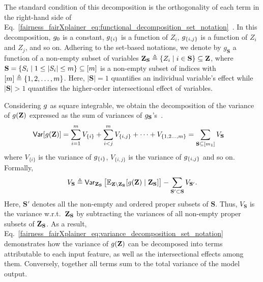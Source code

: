 The standard condition of this decomposition is the orthogonality of each term in the right-hand side of Eq.~\eqref{fairness_fairXplainer_eq:functional_decomposition_set_notation}~\cite{sobol1990sensitivity}. In this decomposition, $ g_0 $ is a constant, $ g_{\{i\}} $ is a function of $ Z_i $, $ g_{\{i,j\}} $ is a function of $ Z_i $ and $ Z_j $, and so on. Adhering to the set-based notations, we denote by $ g_{\mathbf{S}} $ a function of a non-empty subset of variables $ \mathbf{Z}_{\mathbf{S}}  \triangleq \{Z_i \mid i \in \mathbf{S}\} \subseteq \mathbf{Z} $, where $ \mathbf{S} = \{S_i \mid 1 \le |S_i| \le m\} \subseteq [m] $ is a non-empty subset of indices with $ [m] \triangleq \{1,2,\dots, m\}  $.  Here, $|\mathbf{S}|=1$ quantifies an individual variable's effect while $|\mathbf{S}|>1$ quantifies the higher-order intersectional effect of variables.


Considering $ g $ as square integrable, we obtain the decomposition of the variance of $ g(\mathbf{Z}) $ expressed as the sum of variances of $g_{\mathbf{S}}$'s~\cite{sobol1990sensitivity}.
\begin{align}\label{fairness_fairXplainer_eq:variance_decomposition_set_notation}
	\mathsf{Var}[g(\mathbf{Z})] &= \sum_{i=1}^{m}V_{\{i\}} +  \sum_{i<j}^{m} V_{\{i,j\}}  + \dots +  V_{\{1, 2\dots, m\}}= \sum_{\mathbf{S} \subseteq [m_1]} V_{\mathbf{S}} 
\end{align}
where $ V_{\{i\}} $ is the variance of $ g_{\{i\}} $, $ V_{\{i,j\}} $ is the variance of $ g_{\{i,j\}} $ and so on. Formally,   
\begin{equation}
	\label{eq:decomposed_variance}
	V_{\mathbf{S}} \triangleq \mathsf{Var} _{\mathbf{Z}_{\mathbf{S}}}\left[\mathbb{E}_{{\textbf {Z}}\setminus\mathbf{Z}_{\mathbf{S}}}[g(\mathbf{Z})\mid \mathbf{Z}_{\mathbf{S}}]\right]- \sum_{\mathbf{S}' \subset \mathbf{S}}{V} _{\mathbf{S}'}.
\end{equation} 
Here, $\mathbf{S}'$ denotes all the non-empty and ordered proper subsets of $\mathbf{S}$. Thus, $ V_{\mathbf{S}} $ is the variance w.r.t.\ $ \mathbf{Z}_{\mathbf{S}} $ by subtracting the variances of all non-empty proper subsets of $ \mathbf{Z}_{\mathbf{S}} $. As a result, Eq.~\eqref{fairness_fairXplainer_eq:variance_decomposition_set_notation} demonstrates how the variance of $g(\mathbf{Z}) $ can be decomposed into terms attributable to each input feature, as well as the intersectional effects among them. Conversely, together all terms sum to the total variance of the model output. 
